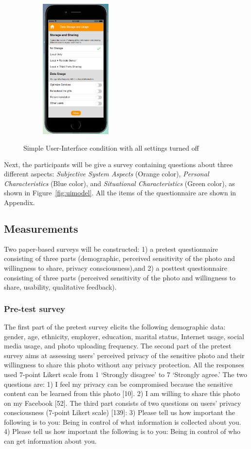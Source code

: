 \begin{figure}
\begin{subfigure}[t]{0.24\textwidth}
	\end{subfigure}%
	~
	\begin{subfigure}[t]{0.24\textwidth}
		\centering
		\includegraphics[height=2.8in]{figures/ui1allOff4.png}
	\end{subfigure}%
	\caption{Simple User-Interface condition with all settings turned off}
	\label{fig:ui1AllOff}
\end{figure}

Next, the participants will be give a survey containing questions about three different aspects: \textit{Subjective System Aspects} (Orange color), \textit{Personal Characteristics} (Blue color), and \textit{Situational Characteristics} (Green color), as shown in Figure~\ref{fig:uimodel}. All the items of the questionnaire are shown in Appendix.

\subsection{Measurements}
Two paper-based surveys will be constructed: 1) a pretest questionnaire consisting of three
parts (demographic, perceived sensitivity of the photo and willingness to share, privacy consciousness),and 2) a posttest questionnaire consisting of three parts (perceived sensitivity of the photo and willingness to share, usability, qualitative feedback).

\subsubsection{Pre-test survey}
The first part of the pretest survey elicits the following demographic data: gender, age,
ethnicity, employer, education, marital status, Internet usage, social media usage, and photo uploading
frequency. The second part of the pretest survey aims at assessing users' perceived privacy
of the sensitive photo and their willingness to share this photo without any privacy protection. All
the responses used 7-point Likert scale from 1 `Strongly disagree' to 7 `Strongly agree.' The two
questions are:
1) I feel my privacy can be compromised because the sensitive content can be learned from this
photo [10].
2)  I am willing to share this photo on my Facebook [52].
The third part consists of two questions on users' privacy consciousness (7-point Likert
scale) [139]:
3) Please tell us how important the following is to you: Being in control of what information is
collected about you.
4) Please tell us how important the following is to you: Being in control of who can get information
about you.

